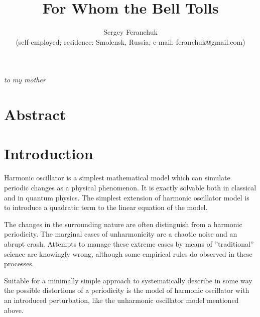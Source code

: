 \documentclass[a4paper]{article}
\begin{document}
\title{For Whom the Bell Tolls}

\author{Sergey Feranchuk \\{\small(self-employed; residence: Smolensk, Russia; e-mail: feranchuk@gmail.com)}}

\maketitle

\begin{flushright}
{\small \textit{to my mother}}
\end{flushright}

\section*{Abstract}




\section{Introduction}

Harmonic oscillator is a simplest mathematical model which can simulate periodic changes as a physical phenomenon. It is exactly solvable both in classical and in quantum physics. The simplest extension of harmonic oscillator model is to introduce a quadratic term to the linear equation of the model. 

The changes in the surrounding nature are often distinguish from a harmonic periodicity. The marginal cases of unharmonicity are a chaotic noise and an abrupt crash. Attempts to manage these extreme cases by means of ''traditional'' science are knowingly wrong, although some empirical rules do observed in these processes.

Suitable for a minimally simple approach to systematically describe in some way the possible distortions of a periodicity is the model of harmonic oscillator with an introduced perturbation, like the unharmonic oscillator model mentioned above. 
\end{document}
